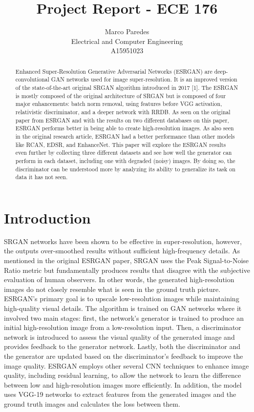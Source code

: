 \documentclass{article}
\title{Project Report - ECE 176}
\author{%
  Marco Paredes \\
  Electrical and Computer Engineering\\
  A15951023\\
}
\begin{document}
\maketitle

\begin{abstract}

    
    Enhanced Super-Resolution Generative Adversarial Networks (ESRGAN) are deep-convolutional GAN networks used for image super-resolution. It is an improved version of the state-of-the-art original SRGAN algorithm introduced in 2017 [1]. The ESRGAN is mostly composed of the original architecture of SRGAN but is composed of four major enhancements: batch norm removal, using features before VGG activation, relativistic discriminator, and a deeper network with RRDB. As seen on the original paper from ESRGAN and with the results on two different databases on this paper, ESRGAN performs better in being able to create high-resolution images. As also seen in the original research article, ESRGAN had a better performance than other models like RCAN, EDSR, and EnhanceNet. This paper will explore the ESRGAN results even further by collecting three different datasets and see how well the generator can perform in each dataset, including one with degraded (noisy) images. By doing so, the discriminator can be understood more by analyzing its ability to generalize its task on data it has not seen. 
    

\end{abstract}

\section{Introduction}
SRGAN networks have been shown to be effective in super-resolution, however, the outputs over-smoothed results without sufficient high-frequency details. As mentioned in the original ESRGAN paper, SRGAN uses the Peak Signal-to-Noise Ratio metric but fundamentally produces results that disagree with the subjective evaluation of human observers. In other words, the generated high-resolution images do not closely resemble what is seen in the ground truth picture. ESRGAN’s primary goal is to upscale low-resolution images while maintaining high-quality visual details. The algorithm is trained on GAN networks where it involved two main stages: first, the network’s generator is trained to produce an initial high-resolution image from a low-resolution input. Then, a discriminator network is introduced to assess the visual quality of the generated image and provides feedback to the generator network. Lastly, both the discriminator and the generator are updated based on the discriminator’s feedback to improve the image quality. ESRGAN employs other several CNN techniques to enhance image quality, including residual learning, to allow the network to learn the difference between low and high-resolution images more efficiently. In addition, the model uses VGG-19 networks to extract features from the generated images and the ground truth images and calculates the loss between them. 
\end{document}
